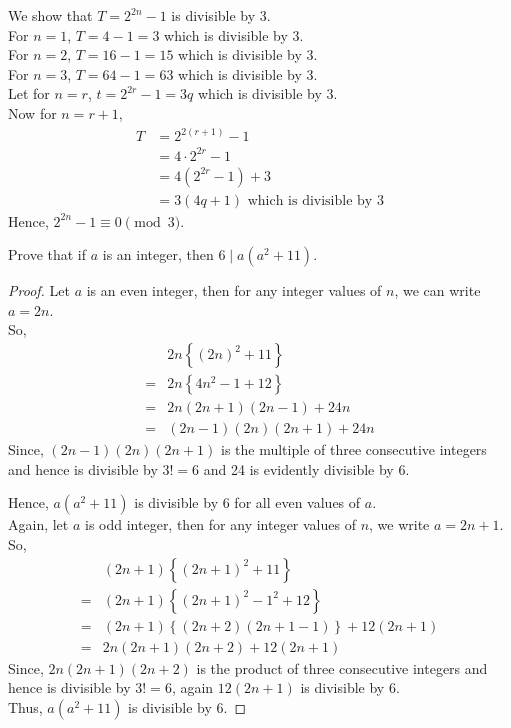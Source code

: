 \documentclass[12pt]{book}
\begin{document}
\begin{soln}
    We show that $ T=2^{2n}-1 $ is divisible by 3.\\
    For $ n=1 $, $ T=4-1=3 $ which is divisible by 3.\\
    For $ n=2 $, $ T=16-1=15 $ which is divisible by 3.\\
    For $ n=3 $, $ T=64-1=63 $ which is divisible by 3.\\

    Let for $ n=r $, $ t=2^{2r}-1=3q $ which is divisible by 3.\\
    Now for $ n=r+1 $,
    \begin{align*}
        T&= 2^{2(r+1)}-1\\
        &= 4\cdot2^{2r}-1\\
        &= 4\left(2^{2r}-1\right)+3\\
        &= 3\left(4q+1\right) \text{ which is divisible by }3
    \end{align*}
    Hence, $ 2^{2n}-1\equiv 0 \pmod{3} $.
\end{soln}
\begin{qn}
    Prove that if $ a $ is an integer, then $ 6\mid a(a^2+11) $.
\end{qn}
\begin{proof}
    Let $ a $ is an even integer, then for any integer values of $ n $, we can write $ a=2n $.\\
    So,
    \begin{align*}
        &2n\left\{ (2n)^2+11 \right\}\\
        =&2n\left\{ 4n^2-1+12 \right\}\\
        =&2n(2n+1)(2n-1)+24n\\
        =&(2n-1)(2n)(2n+1)+24n
    \end{align*}
    Since, $ (2n-1)(2n)(2n+1) $ is the multiple of three consecutive integers and hence is divisible by $ 3!=6 $ and 24 is evidently divisible by 6.

    Hence, $ a(a^2+11) $ is divisible by 6 for all even values of $ a $.\\

    Again, let $ a $ is odd integer, then for any integer values of $ n $, we write $ a=2n+1 $.\\
    So,
    \begin{align*}
        &(2n+1)\left\{ (2n+1)^2+11 \right\}\\
        =&(2n+1)\left\{ (2n+1)^2-1^2+12 \right\}\\
        =&(2n+1)\left\{(2n+2)(2n+1-1)\right\}+12(2n+1)\\
        =&2n(2n+1)(2n+2)+12(2n+1)
    \end{align*}
    Since, $ 2n(2n+1)(2n+2) $ is the product of three consecutive integers and hence is divisible by $ 3!=6 $, again $ 12(2n+1) $ is divisible by 6.\\

    Thus, $ a(a^2+11) $ is divisible by 6.
\end{proof}
\end{document}
